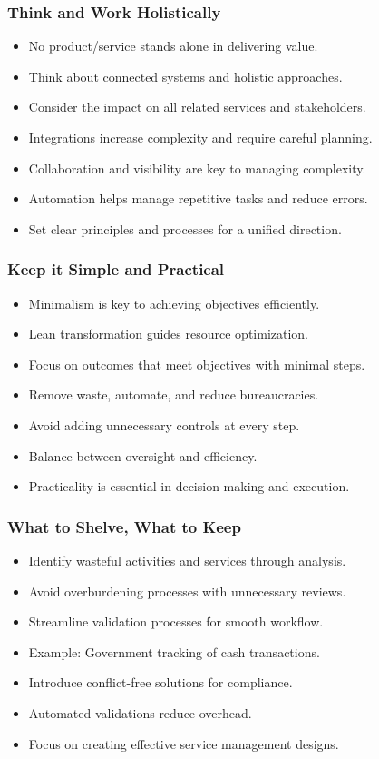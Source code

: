\documentclass[aspectratio=169, table]{beamer}
\begin{document}
\begin{frame}
\frametitle{Think and Work Holistically}

\begin{itemize}
	\item No product/service stands alone in delivering value.
	\item Think about connected systems and holistic approaches.
	\item Consider the impact on all related services and stakeholders.
	\item Integrations increase complexity and require careful planning.
	\item Collaboration and visibility are key to managing complexity.
	\item Automation helps manage repetitive tasks and reduce errors.
	\item Set clear principles and processes for a unified direction.
\end{itemize}
\end{frame}

\begin{frame}
\frametitle{Keep it Simple and Practical}

\begin{itemize}
	\item Minimalism is key to achieving objectives efficiently.
	\item Lean transformation guides resource optimization.
	\item Focus on outcomes that meet objectives with minimal steps.
	\item Remove waste, automate, and reduce bureaucracies.
	\item Avoid adding unnecessary controls at every step.
	\item Balance between oversight and efficiency.
	\item Practicality is essential in decision-making and execution.
\end{itemize}
\end{frame}

\begin{frame}
\frametitle{What to Shelve, What to Keep}

\begin{itemize}
	\item Identify wasteful activities and services through analysis.
	\item Avoid overburdening processes with unnecessary reviews.
	\item Streamline validation processes for smooth workflow.
	\item Example: Government tracking of cash transactions.
	\item Introduce conflict-free solutions for compliance.
	\item Automated validations reduce overhead.
	\item Focus on creating effective service management designs.
\end{itemize}
\end{frame}
\end{document}

